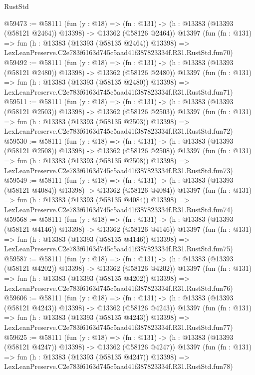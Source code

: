 \begin{lexlean}{RustStd}
\begin{coremodule}
@59473 := @58111
    (fun (y : @18) =>
    (fn : @131) -> (h : @13383 (@13393 (@58121 @2464)) @13398) -> @13362 (@58126 @2464))
    @13397
    (fun (fn : @131) =>
    fun (h : @13383 (@13393 (@58135 @2464)) @13398) =>
    LexLeanPreserve.C2e783f6163d745c5aad41f387823334f.R31.RustStd.fun70)
@59492 := @58111
    (fun (y : @18) =>
    (fn : @131) -> (h : @13383 (@13393 (@58121 @2480)) @13398) -> @13362 (@58126 @2480))
    @13397
    (fun (fn : @131) =>
    fun (h : @13383 (@13393 (@58135 @2480)) @13398) =>
    LexLeanPreserve.C2e783f6163d745c5aad41f387823334f.R31.RustStd.fun71)
@59511 := @58111
    (fun (y : @18) =>
    (fn : @131) -> (h : @13383 (@13393 (@58121 @2503)) @13398) -> @13362 (@58126 @2503))
    @13397
    (fun (fn : @131) =>
    fun (h : @13383 (@13393 (@58135 @2503)) @13398) =>
    LexLeanPreserve.C2e783f6163d745c5aad41f387823334f.R31.RustStd.fun72)
@59530 := @58111
    (fun (y : @18) =>
    (fn : @131) -> (h : @13383 (@13393 (@58121 @2508)) @13398) -> @13362 (@58126 @2508))
    @13397
    (fun (fn : @131) =>
    fun (h : @13383 (@13393 (@58135 @2508)) @13398) =>
    LexLeanPreserve.C2e783f6163d745c5aad41f387823334f.R31.RustStd.fun73)
@59549 := @58111
    (fun (y : @18) =>
    (fn : @131) -> (h : @13383 (@13393 (@58121 @4084)) @13398) -> @13362 (@58126 @4084))
    @13397
    (fun (fn : @131) =>
    fun (h : @13383 (@13393 (@58135 @4084)) @13398) =>
    LexLeanPreserve.C2e783f6163d745c5aad41f387823334f.R31.RustStd.fun74)
@59568 := @58111
    (fun (y : @18) =>
    (fn : @131) -> (h : @13383 (@13393 (@58121 @4146)) @13398) -> @13362 (@58126 @4146))
    @13397
    (fun (fn : @131) =>
    fun (h : @13383 (@13393 (@58135 @4146)) @13398) =>
    LexLeanPreserve.C2e783f6163d745c5aad41f387823334f.R31.RustStd.fun75)
@59587 := @58111
    (fun (y : @18) =>
    (fn : @131) -> (h : @13383 (@13393 (@58121 @4202)) @13398) -> @13362 (@58126 @4202))
    @13397
    (fun (fn : @131) =>
    fun (h : @13383 (@13393 (@58135 @4202)) @13398) =>
    LexLeanPreserve.C2e783f6163d745c5aad41f387823334f.R31.RustStd.fun76)
@59606 := @58111
    (fun (y : @18) =>
    (fn : @131) -> (h : @13383 (@13393 (@58121 @4243)) @13398) -> @13362 (@58126 @4243))
    @13397
    (fun (fn : @131) =>
    fun (h : @13383 (@13393 (@58135 @4243)) @13398) =>
    LexLeanPreserve.C2e783f6163d745c5aad41f387823334f.R31.RustStd.fun77)
@59625 := @58111
    (fun (y : @18) =>
    (fn : @131) -> (h : @13383 (@13393 (@58121 @4247)) @13398) -> @13362 (@58126 @4247))
    @13397
    (fun (fn : @131) =>
    fun (h : @13383 (@13393 (@58135 @4247)) @13398) =>
    LexLeanPreserve.C2e783f6163d745c5aad41f387823334f.R31.RustStd.fun78)

\end{coremodule}
\end{lexlean}
